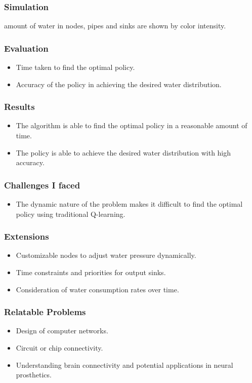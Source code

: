 \documentclass[notheorems, aspectratio=54]{beamer}
\begin{document}
\begin{frame}
	\frametitle{Simulation}
		amount of water in nodes, pipes and sinks are shown by color intensity.
\end{frame}


\begin{frame}
	\frametitle{Evaluation}
	\begin{itemize}
		\item Time taken to find the optimal policy.
		\item Accuracy of the policy in achieving the desired water distribution.
	\end{itemize}
\end{frame}

\begin{frame}
	\frametitle{Results}
	\begin{itemize}
		\item The algorithm is able to find the optimal policy in a reasonable amount of time.
		\item The policy is able to achieve the desired water distribution with high accuracy.
	\end{itemize}
\end{frame}

\begin{frame}
	\frametitle{Challenges I faced}
	\begin{itemize}
		\item The dynamic nature of the problem makes it difficult to find the optimal policy using traditional Q-learning.
	\end{itemize}
\end{frame}

\begin{frame}
	\frametitle{Extensions}
	\begin{itemize}
		\item Customizable nodes to adjust water pressure dynamically.
		\item Time constraints and priorities for output sinks.
		\item Consideration of water consumption rates over time.
	\end{itemize}
\end{frame}

\begin{frame}
	\frametitle{Relatable Problems}
	\begin{itemize}
		\item Design of computer networks.
		\item Circuit or chip connectivity.
		\item Understanding brain connectivity and potential applications in neural prosthetics.
	\end{itemize}
\end{frame}
\end{document}
